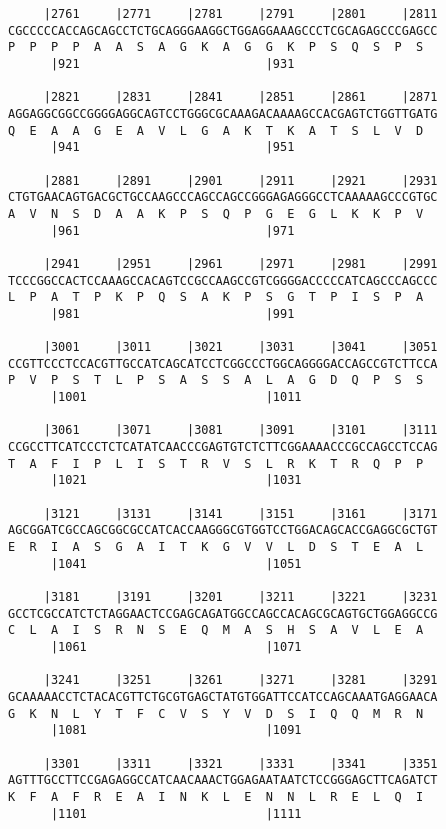 \documentclass{article}
\begin{document}
\begin{Verbatim}
     |2761     |2771     |2781     |2791     |2801     |2811
CGCCCCCACCAGCAGCCTCTGCAGGGAAGGCTGGAGGAAAGCCCTCGCAGAGCCCGAGCC
P  P  P  P  A  A  S  A  G  K  A  G  G  K  P  S  Q  S  P  S  
      |921                          |931                    
  
     |2821     |2831     |2841     |2851     |2861     |2871
AGGAGGCGGCCGGGGAGGCAGTCCTGGGCGCAAAGACAAAAGCCACGAGTCTGGTTGATG
Q  E  A  A  G  E  A  V  L  G  A  K  T  K  A  T  S  L  V  D  
      |941                          |951                    
  
     |2881     |2891     |2901     |2911     |2921     |2931
CTGTGAACAGTGACGCTGCCAAGCCCAGCCAGCCGGGAGAGGGCCTCAAAAAGCCCGTGC
A  V  N  S  D  A  A  K  P  S  Q  P  G  E  G  L  K  K  P  V  
      |961                          |971                    
  
     |2941     |2951     |2961     |2971     |2981     |2991
TCCCGGCCACTCCAAAGCCACAGTCCGCCAAGCCGTCGGGGACCCCCATCAGCCCAGCCC
L  P  A  T  P  K  P  Q  S  A  K  P  S  G  T  P  I  S  P  A  
      |981                          |991                    
  
     |3001     |3011     |3021     |3031     |3041     |3051
CCGTTCCCTCCACGTTGCCATCAGCATCCTCGGCCCTGGCAGGGGACCAGCCGTCTTCCA
P  V  P  S  T  L  P  S  A  S  S  A  L  A  G  D  Q  P  S  S  
      |1001                         |1011                   
  
     |3061     |3071     |3081     |3091     |3101     |3111
CCGCCTTCATCCCTCTCATATCAACCCGAGTGTCTCTTCGGAAAACCCGCCAGCCTCCAG
T  A  F  I  P  L  I  S  T  R  V  S  L  R  K  T  R  Q  P  P  
      |1021                         |1031                   
  
     |3121     |3131     |3141     |3151     |3161     |3171
AGCGGATCGCCAGCGGCGCCATCACCAAGGGCGTGGTCCTGGACAGCACCGAGGCGCTGT
E  R  I  A  S  G  A  I  T  K  G  V  V  L  D  S  T  E  A  L  
      |1041                         |1051                   
  
     |3181     |3191     |3201     |3211     |3221     |3231
GCCTCGCCATCTCTAGGAACTCCGAGCAGATGGCCAGCCACAGCGCAGTGCTGGAGGCCG
C  L  A  I  S  R  N  S  E  Q  M  A  S  H  S  A  V  L  E  A  
      |1061                         |1071                   
  
     |3241     |3251     |3261     |3271     |3281     |3291
GCAAAAACCTCTACACGTTCTGCGTGAGCTATGTGGATTCCATCCAGCAAATGAGGAACA
G  K  N  L  Y  T  F  C  V  S  Y  V  D  S  I  Q  Q  M  R  N  
      |1081                         |1091                   
  
     |3301     |3311     |3321     |3331     |3341     |3351
AGTTTGCCTTCCGAGAGGCCATCAACAAACTGGAGAATAATCTCCGGGAGCTTCAGATCT
K  F  A  F  R  E  A  I  N  K  L  E  N  N  L  R  E  L  Q  I  
      |1101                         |1111                   
  

\end{Verbatim}
\end{document}
